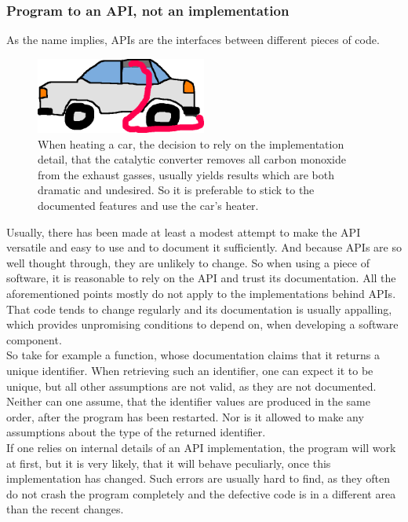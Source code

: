 		\subsubsection{Program to an API, not an implementation}
			As the name implies, APIs are the interfaces between different pieces of code.
			\begin{figure}
				\centering
				\includegraphics[width=0.5\textwidth]{Images/CarHeater.png}
				\caption[CarHeater]{When heating a car, the decision to rely on the implementation detail, that the catalytic converter removes all carbon monoxide from the exhaust gasses, usually yields results which are both dramatic and undesired. So it is preferable to stick to the documented features and use the car's heater.}
			\end{figure}
			Usually, there has been made at least a modest attempt to make the API versatile and easy to use and to document it sufficiently.
			And because APIs are so well thought through, they are unlikely to change.
			So when using a piece of software, it is reasonable to rely on the API and trust its documentation.
			All the aforementioned points mostly do not apply to the implementations behind APIs.
			That code tends to change regularly and its documentation is usually appalling, which provides unpromising conditions to depend on, when developing a software component.\\
			So take for example a function, whose documentation claims that it returns a unique identifier.
			When retrieving such an identifier, one can expect it to be unique, but all other assumptions are not valid, as they are not documented.
			Neither can one assume, that the identifier values are produced in the same order, after the program has been restarted.
			Nor is it allowed to make any assumptions about the type of the returned identifier.\\
			If one relies on internal details of an API implementation, the program will work at first, but it is very likely, that it will behave peculiarly, once this implementation has changed.
			Such errors are usually hard to find, as they often do not crash the program completely and the defective code is in a different area than the recent changes.

